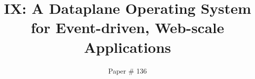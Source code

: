 \documentclass[10pt,twocolumn]{article}
\newif\ifcomments
\begin{document}
\title{\bf IX: A Dataplane Operating System for \break Event-driven, Web-scale Applications}


\author{Paper \# 136}
\date{}
\maketitle
\thispagestyle{empty}













 

\ifcomments

\fi

\end{document}
